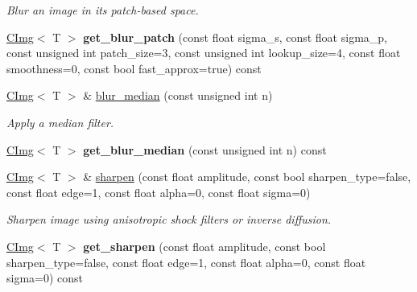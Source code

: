\begin{DoxyCompactItemize}
\begin{DoxyCompactList}\small\item\em Blur an image in its patch-\/based space. \item\end{DoxyCompactList}\item 
\hypertarget{structcimg__library_1_1CImg_a8c23ee1a41a1bafbeb99c18e6bbaceae}{
\hyperlink{structcimg__library_1_1CImg}{CImg}$<$ T $>$ {\bfseries get\_\-blur\_\-patch} (const float sigma\_\-s, const float sigma\_\-p, const unsigned int patch\_\-size=3, const unsigned int lookup\_\-size=4, const float smoothness=0, const bool fast\_\-approx=true) const }
\label{structcimg__library_1_1CImg_a8c23ee1a41a1bafbeb99c18e6bbaceae}

\item 
\hypertarget{structcimg__library_1_1CImg_a55c5427152277f80c6cb9a36ae77ddf1}{
\hyperlink{structcimg__library_1_1CImg}{CImg}$<$ T $>$ \& \hyperlink{structcimg__library_1_1CImg_a55c5427152277f80c6cb9a36ae77ddf1}{blur\_\-median} (const unsigned int n)}
\label{structcimg__library_1_1CImg_a55c5427152277f80c6cb9a36ae77ddf1}

\begin{DoxyCompactList}\small\item\em Apply a median filter. \item\end{DoxyCompactList}\item 
\hypertarget{structcimg__library_1_1CImg_a4fddfa0c54a058a49bbbb23d99d00da0}{
\hyperlink{structcimg__library_1_1CImg}{CImg}$<$ T $>$ {\bfseries get\_\-blur\_\-median} (const unsigned int n) const }
\label{structcimg__library_1_1CImg_a4fddfa0c54a058a49bbbb23d99d00da0}

\item 
\hypertarget{structcimg__library_1_1CImg_a4ecd4ea634e87995ef1d309b8ffe91de}{
\hyperlink{structcimg__library_1_1CImg}{CImg}$<$ T $>$ \& \hyperlink{structcimg__library_1_1CImg_a4ecd4ea634e87995ef1d309b8ffe91de}{sharpen} (const float amplitude, const bool sharpen\_\-type=false, const float edge=1, const float alpha=0, const float sigma=0)}
\label{structcimg__library_1_1CImg_a4ecd4ea634e87995ef1d309b8ffe91de}

\begin{DoxyCompactList}\small\item\em Sharpen image using anisotropic shock filters or inverse diffusion. \item\end{DoxyCompactList}\item 
\hypertarget{structcimg__library_1_1CImg_ac81c77a021a6b97096bc46dbd5b7861a}{
\hyperlink{structcimg__library_1_1CImg}{CImg}$<$ T $>$ {\bfseries get\_\-sharpen} (const float amplitude, const bool sharpen\_\-type=false, const float edge=1, const float alpha=0, const float sigma=0) const }
\label{structcimg__library_1_1CImg_ac81c77a021a6b97096bc46dbd5b7861a}


\end{DoxyCompactItemize}
